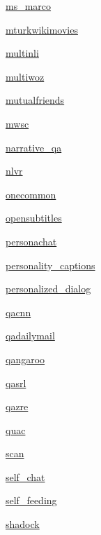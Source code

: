 \begin{DoxyCompactItemize}
\item 
 \hyperlink{namespaceparlai_1_1tasks_1_1ms__marco}{ms\+\_\+marco}
\item 
 \hyperlink{namespaceparlai_1_1tasks_1_1mturkwikimovies}{mturkwikimovies}
\item 
 \hyperlink{namespaceparlai_1_1tasks_1_1multinli}{multinli}
\item 
 \hyperlink{namespaceparlai_1_1tasks_1_1multiwoz}{multiwoz}
\item 
 \hyperlink{namespaceparlai_1_1tasks_1_1mutualfriends}{mutualfriends}
\item 
 \hyperlink{namespaceparlai_1_1tasks_1_1mwsc}{mwsc}
\item 
 \hyperlink{namespaceparlai_1_1tasks_1_1narrative__qa}{narrative\+\_\+qa}
\item 
 \hyperlink{namespaceparlai_1_1tasks_1_1nlvr}{nlvr}
\item 
 \hyperlink{namespaceparlai_1_1tasks_1_1onecommon}{onecommon}
\item 
 \hyperlink{namespaceparlai_1_1tasks_1_1opensubtitles}{opensubtitles}
\item 
 \hyperlink{namespaceparlai_1_1tasks_1_1personachat}{personachat}
\item 
 \hyperlink{namespaceparlai_1_1tasks_1_1personality__captions}{personality\+\_\+captions}
\item 
 \hyperlink{namespaceparlai_1_1tasks_1_1personalized__dialog}{personalized\+\_\+dialog}
\item 
 \hyperlink{namespaceparlai_1_1tasks_1_1qacnn}{qacnn}
\item 
 \hyperlink{namespaceparlai_1_1tasks_1_1qadailymail}{qadailymail}
\item 
 \hyperlink{namespaceparlai_1_1tasks_1_1qangaroo}{qangaroo}
\item 
 \hyperlink{namespaceparlai_1_1tasks_1_1qasrl}{qasrl}
\item 
 \hyperlink{namespaceparlai_1_1tasks_1_1qazre}{qazre}
\item 
 \hyperlink{namespaceparlai_1_1tasks_1_1quac}{quac}
\item 
 \hyperlink{namespaceparlai_1_1tasks_1_1scan}{scan}
\item 
 \hyperlink{namespaceparlai_1_1tasks_1_1self__chat}{self\+\_\+chat}
\item 
 \hyperlink{namespaceparlai_1_1tasks_1_1self__feeding}{self\+\_\+feeding}
\item 
 \hyperlink{namespaceparlai_1_1tasks_1_1shadock}{shadock}
\item 

\end{DoxyCompactItemize}
